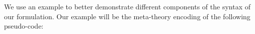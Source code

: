 We use an example to better demonstrate different components of the syntax of our formulation. Our example will be the meta-theory encoding of the following pseudo-code:


